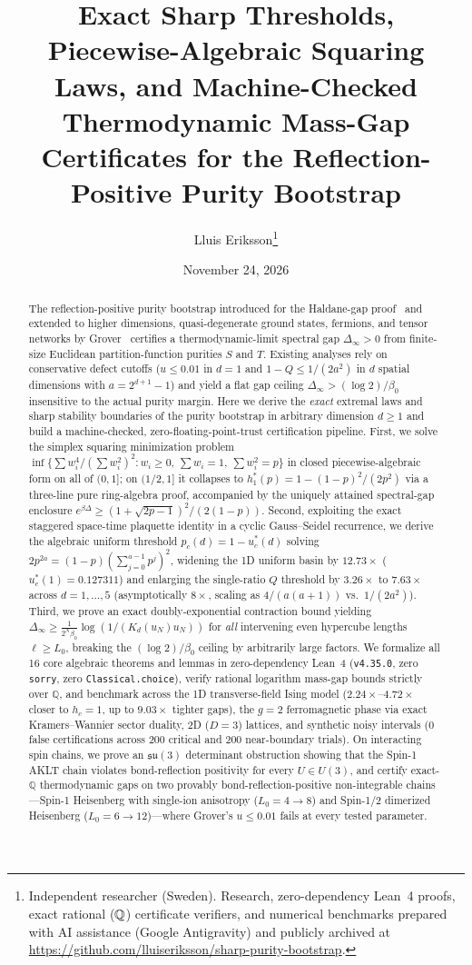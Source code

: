 \documentclass[11pt,a4paper]{article}
\title{\textbf{Exact Sharp Thresholds, Piecewise-Algebraic Squaring Laws, and Machine-Checked Thermodynamic Mass-Gap Certificates for the Reflection-Positive Purity Bootstrap}}
\author{Lluis Eriksson\thanks{Independent researcher (Sweden). Research, zero-dependency Lean~4 proofs, exact rational ($\Q$) certificate verifiers, and numerical benchmarks prepared with AI assistance (Google Antigravity) and publicly archived at \url{https://github.com/lluiseriksson/sharp-purity-bootstrap}.}}
\date{November 24, 2026}
\theoremstyle{definition}
\newcommand{\Q}{\mathbb{Q}}
\begin{document}
\maketitle

\begin{abstract}
The reflection-positive purity bootstrap introduced for the Haldane-gap proof~\cite{OpenAI2026Haldane,Tasaki2026Purity} and extended to higher dimensions, quasi-degenerate ground states, fermions, and tensor networks by Grover~\cite{Grover2026Extensions} certifies a thermodynamic-limit spectral gap $\Delta_\infty > 0$ from finite-size Euclidean partition-function purities $S$ and $T$. Existing analyses rely on conservative defect cutoffs ($u \le 0.01$ in $d=1$ and $1 - Q \le 1/(2a^2)$ in $d$ spatial dimensions with $a = 2^{d+1}-1$) and yield a flat gap ceiling $\Delta_\infty > (\log 2)/\beta_0$ insensitive to the actual purity margin. Here we derive the \emph{exact} extremal laws and sharp stability boundaries of the purity bootstrap in arbitrary dimension $d \ge 1$ and build a machine-checked, zero-floating-point-trust certification pipeline. First, we solve the simplex squaring minimization problem $\inf\{\sum w_i^4 / (\sum w_i^2)^2 : w_i \ge 0,\ \sum w_i = 1,\ \sum w_i^2 = p\}$ in closed piecewise-algebraic form on all of $(0,1]$; on $(1/2,1]$ it collapses to $h_1^*(p) = 1 - (1-p)^2/(2p^2)$ via a three-line pure ring-algebra proof, accompanied by the uniquely attained spectral-gap enclosure $e^{\beta \Delta} \ge (1+\sqrt{2p-1})^2/(2(1-p))$. Second, exploiting the exact staggered space-time plaquette identity in a cyclic Gauss--Seidel recurrence, we derive the algebraic uniform threshold $p_c(d) = 1 - u_c^*(d)$ solving $2p^{2a} = (1-p)(\sum_{j=0}^{a-1} p^j)^2$, widening the 1D uniform basin by $12.73\times$ ($u_c^*(1) = 0.127311$) and enlarging the single-ratio $Q$ threshold by $3.26\times$ to $7.63\times$ across $d = 1,\dots,5$ (asymptotically $8\times$, scaling as $4/(a(a+1))$ vs.\ $1/(2a^2)$). Third, we prove an exact doubly-exponential contraction bound yielding $\Delta_\infty \ge \frac{1}{2^N \beta_0}\log(1/(K_d(u_N)u_N))$ for \emph{all} intervening even hypercube lengths $\ell \ge L_0$, breaking the $(\log 2)/\beta_0$ ceiling by arbitrarily large factors. We formalize all 16 core algebraic theorems and lemmas in zero-dependency Lean~4 (\texttt{v4.35.0}, zero \texttt{sorry}, zero \texttt{Classical.choice}), verify rational logarithm mass-gap bounds strictly over $\Q$, and benchmark across the 1D transverse-field Ising model ($2.24\times$--$4.72\times$ closer to $h_c=1$, up to $9.03\times$ tighter gaps), the $g=2$ ferromagnetic phase via exact Kramers--Wannier sector duality, 2D ($D=3$) lattices, and synthetic noisy intervals (0 false certifications across 200 critical and 200 near-boundary trials). On interacting spin chains, we prove an $\mathfrak{su}(3)$ determinant obstruction showing that the Spin-1 AKLT chain violates bond-reflection positivity for every $U \in U(3)$, and certify exact-$\Q$ thermodynamic gaps on two provably bond-reflection-positive non-integrable chains—Spin-1 Heisenberg with single-ion anisotropy ($L_0=4 \to 8$) and Spin-1/2 dimerized Heisenberg ($L_0=6 \to 12$)—where Grover's $u \le 0.01$ fails at every tested parameter.
\end{abstract}
\end{document}
